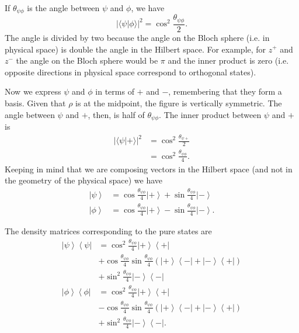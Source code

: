 \documentclass[twocolumn,prl,floatfix,superscriptaddress]{revtex4-2}
\begin{document}
If $\theta_{\psi\phi}$ is the angle between $\psi$ and $\phi$, we have
\begin{equation}
	|\langle \psi | \phi \rangle |^2 = \cos^2 \frac{\theta_{\psi\phi}}{2}.
\end{equation}
The angle is divided by two because the angle on the Bloch sphere (i.e. in physical space) is double the angle in the Hilbert space. For example, for $z^+$ and $z^-$ the angle on the Bloch sphere would be $\pi$ and the inner product is zero (i.e. opposite directions in physical space correspond to orthogonal states).

Now we express $\psi$ and $\phi$ in terms of $+$ and $-$, remembering that they form a basis. Given that $\rho$ is at the midpoint, the figure is vertically symmetric. The angle between $\psi$ and $+$, then, is half of $\theta_{\psi\phi}$. The inner product between $\psi$ and $+$ is
\begin{equation}
	\begin{aligned}
		|\langle \psi | + \rangle |^2 &= \cos^2 \frac{\theta_{\psi +}}{2} \\
		&= \cos^2 \frac{\theta_{\psi\phi}}{4}.
	\end{aligned}
\end{equation}
Keeping in mind that we are composing vectors in the Hilbert space (and not in the geometry of the physical space) we have
\begin{align*}
	\left|\psi\right>&=\cos\frac{\theta_{\psi\phi}}{4}\left|+\right>+\sin\frac{\theta_{\psi\phi}}{4}\left|-\right> \\
	\left|\phi\right>&=\cos\frac{\theta_{\psi\phi}}{4}\left|+\right>-\sin\frac{\theta_{\psi\phi}}{4}\left|-\right>.
\end{align*}

The density matrices corresponding to the pure states are
\begin{align*}
	\left|\psi\right>\left<\psi\right|&=\cos^2\frac{\theta_{\psi\phi}}{4}\left|+\right>\left<+\right|\\
	&+\cos\frac{\theta_{\psi\phi}}{4}\sin\frac{\theta_{\psi\phi}}{4}\left(\left|+\right>\left<-\right|+\left|-\right>\left<+\right|\right) \\
	&+\sin^2\frac{\theta_{\psi\phi}}{4}\left|-\right>\left<-\right| \\
	\left|\phi\right>\left<\phi\right|&=\cos^2\frac{\theta_{\psi\phi}}{4}\left|+\right>\left<+\right|\\
	&-\cos\frac{\theta_{\psi\phi}}{4}\sin\frac{\theta_{\psi\phi}}{4}\left(\left|+\right>\left<-\right|+\left|-\right>\left<+\right|\right) \\
	&+\sin^2\frac{\theta_{\psi\phi}}{4}\left|-\right>\left<-\right|.
\end{align*}
\end{document}
